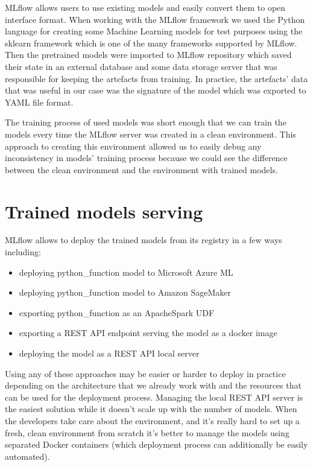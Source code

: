 MLflow allows users to use existing models and easily convert them to open interface format.
When working with the MLflow framework we used the Python language for creating some Machine
Learning models for test purposes using the sklearn framework which is one of the many frameworks
supported by MLflow. Then the pretrained models were imported to MLflow repository which saved
their state in an external database and some data storage server that was responsible for keeping
the artefacts from training. In practice, the artefacts' data that was useful in our case was the
signature of the model which was exported to YAML file format.

The training process of used models was short enough that we can train the models every time the
MLflow server was created in a clean environment. This approach to creating this environment
allowed us to easily debug any inconsistency in models' training process because we could see
the difference between the clean environment and the environment with trained models.

\section{Trained models serving}

MLflow allows to deploy the trained models from its registry in a few ways including:
\begin{itemize}
	\item deploying python_function model to Microsoft Azure ML
	\item deploying python_function model to Amazon SageMaker
	\item exporting python_function as an ApacheSpark UDF
	\item exporting a REST API endpoint serving the model as a docker image
	\item deploying the model as a REST API local server
\end{itemize}

Using any of these approaches may be easier or harder to deploy in practice depending on the architecture
that we already work with and the resources that can be used for the deployment process. Managing the local
REST API server is the easiest solution while it doesn’t scale up with the number of models. When the
developers take care about the environment, and it’s really hard to set up a fresh, clean environment
from scratch it’s better to manage the models using separated Docker containers (which deployment
process can additionally be easily automated).

